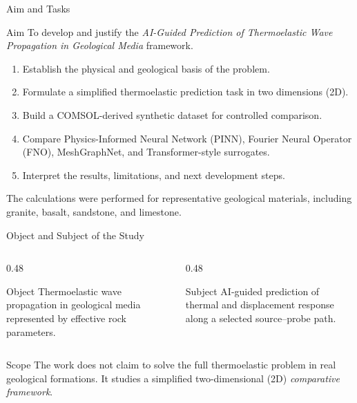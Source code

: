 \documentclass[aspectratio=169,10pt]{beamer}
\begin{document}
\begin{frame}{Aim and Tasks}
  \begin{block}{Aim}
    To develop and justify the
    \emph{AI-Guided Prediction of Thermoelastic Wave Propagation in Geological Media}
    framework.
  \end{block}
  \vskip 4pt
  \begin{enumerate}
    \item Establish the physical and geological basis of the problem.
    \item Formulate a simplified thermoelastic prediction task in two dimensions (2D).
    \item Build a COMSOL-derived synthetic dataset for controlled comparison.
    \item Compare Physics-Informed Neural Network (PINN), Fourier Neural
          Operator (FNO), MeshGraphNet, and Transformer-style surrogates.
    \item Interpret the results, limitations, and next development steps.
  \end{enumerate}
  \vskip 4pt
  \footnotesize
  The calculations were performed for representative geological materials,
  including granite, basalt, sandstone, and limestone.
\end{frame}

\begin{frame}{Object and Subject of the Study}
  \begin{columns}[T]
    \begin{column}{0.48\textwidth}
      \begin{block}{Object}
        Thermoelastic wave propagation in geological media represented by
        effective rock parameters.
      \end{block}
    \end{column}
    \begin{column}{0.48\textwidth}
      \begin{block}{Subject}
        AI-guided prediction of thermal and displacement
        response along a selected source--probe path.
      \end{block}
    \end{column}
  \end{columns}
  \vskip 6pt
  \begin{alertblock}{Scope}
    The work does not claim to solve the full thermoelastic problem in
    real geological formations. It studies a simplified two-dimensional (2D)
    \emph{comparative framework}.
  \end{alertblock}
\end{frame}
\end{document}
